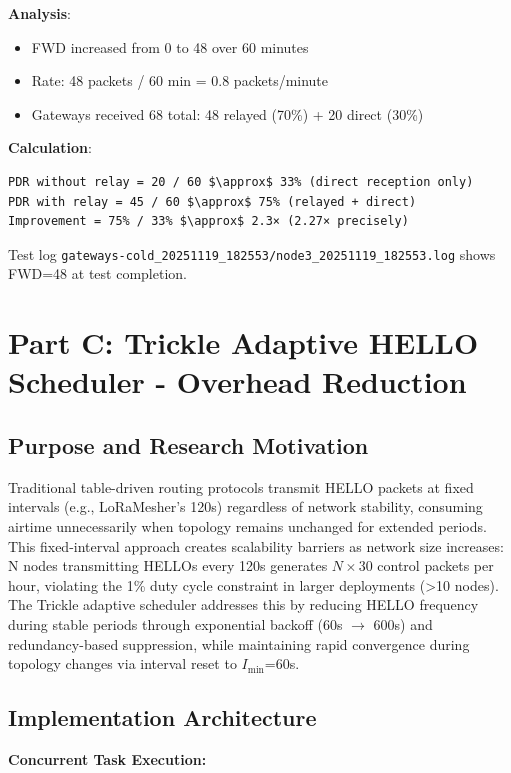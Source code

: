 \textbf{Analysis}:
\begin{itemize}
\item FWD increased from 0 to 48 over 60 minutes
\item Rate: 48 packets / 60 min = 0.8 packets/minute
\item Gateways received 68 total: 48 relayed (70\%) + 20 direct (30\%)
\end{itemize}

\textbf{Calculation}:
\begin{verbatim}
PDR without relay = 20 / 60 $\approx$ 33% (direct reception only)
PDR with relay = 45 / 60 $\approx$ 75% (relayed + direct)
Improvement = 75% / 33% $\approx$ 2.3× (2.27× precisely)
\end{verbatim}

Test log \texttt{gateways-cold\_20251119\_182553/node3\_20251119\_182553.log} shows FWD=48 at test completion.

\section{Part C: Trickle Adaptive HELLO Scheduler - Overhead Reduction}
\label{sec:trickle-overhead}

\subsection{Purpose and Research Motivation}

Traditional table-driven routing protocols transmit HELLO packets at fixed intervals (e.g., LoRaMesher's 120s) regardless of network stability, consuming airtime unnecessarily when topology remains unchanged for extended periods. This fixed-interval approach creates scalability barriers as network size increases: N nodes transmitting HELLOs every 120s generates $N \times 30$ control packets per hour, violating the 1\% duty cycle constraint in larger deployments (>10 nodes). The Trickle adaptive scheduler addresses this by reducing HELLO frequency during stable periods through exponential backoff (60s $\rightarrow$ 600s) and redundancy-based suppression, while maintaining rapid convergence during topology changes via interval reset to $I_{\min}$=60s.

\subsection{Implementation Architecture}

\textbf{Concurrent Task Execution:}

